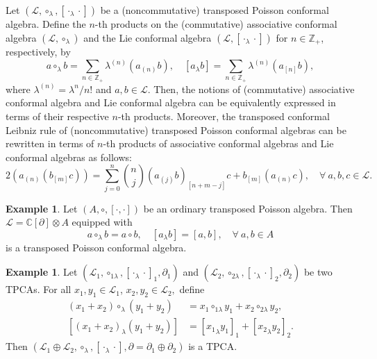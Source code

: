 \documentclass[11pt,letterpaper,reqno]{amsart}
\theoremstyle{definition}
\newtheorem{example}[theorem]{Example}
\numberwithin{equation}{section}
\begin{document}
Let $(\mathcal{L},\circ_{\lambda},[{\cdot_ \lambda \cdot}])$ be a (noncommutative) transposed Poisson conformal algebra.
Define the $n$-th products on the (commutative) associative conformal algebra $(\mathcal{L},\circ_{\lambda})$ and the Lie conformal algebra $(\mathcal{L},[{\cdot_ \lambda \cdot}])$ for $n\in \mathbb{Z}_{+}$, respectively, by
   \begin{equation*}
      a\circ_\lambda b=\sum_{n\in \mathbb{Z}_{+}}\lambda^{(n)}(a_{(n)}b),\quad[a_\lambda b]=\sum_{n\in \mathbb{Z}_{+}}\lambda^{(n)}(a_{[n]}b),
   \end{equation*}
where $\lambda^{(n)}=\lambda^{n}/{n!}$ and $a,b\in \mathcal{L}$. Then, the notions of (commutative) associative conformal algebra and Lie conformal algebra can be equivalently expressed in terms of their respective $n$-th products.
Moreover, the transposed conformal Leibniz rule of (noncommutative) transposed Poisson conformal algebras can be rewritten in terms of $n$-th products of associative conformal algebras and Lie conformal algebras as follows:
   \begin{equation}\label{rule4}
      2(a_{(n)}(b_{[m]}c))=\sum_{j=0}^n\binom{n}{j}(a_{(j)}b)_{[n+m-j]}c+b_{{[m]}}(a_{(n)}c),\quad\forall~ a,b,c\in \mathcal{L}.
   \end{equation}

\begin{example}
  Let $(A,\circ,[\cdot,\cdot])$ be an ordinary transposed Poisson algebra. Then $\mathcal{L}=\mathbb{C}[\partial]\otimes A$ equipped with
  $$a \circ_{\lambda} b=a \circ b,\quad[{a_ \lambda b}]=[a,b],\quad\forall~ a,b\in A$$
  is a transposed Poisson conformal algebra.%
\end{example}

\begin{example}
Let $(\mathcal{L}_1 ,\circ_{1\lambda},[\cdot_{\lambda}\cdot]_1,\partial_1)$ and $(\mathcal{L}_2 ,\circ_{2\lambda},[\cdot_{\lambda}\cdot]_2,\partial_2)$ be two TPCAs. For all $x_1,y_1 \in \mathcal{L}_1$, $x_2,y_2 \in \mathcal{L}_2,$ define
\begin{align*}
(x_1+x_2)\circ_{\lambda}(y_1+y_2)&=x_1\circ_{1\lambda}y_1+x_2\circ_{2\lambda}y_2, \\
[(x_1+x_2)_{\lambda}(y_1+y_2)]&=[{x_1}_{\lambda}y_1]_1+[{x_2}_{\lambda}y_2]_2.
\end{align*}
Then $(\mathcal{L}_1 \oplus \mathcal{L}_2, \circ_{\lambda}, [\cdot_{\lambda}\cdot], \partial=\partial_1\oplus\partial_2)$ is a TPCA.
\end{example}
\end{document}
